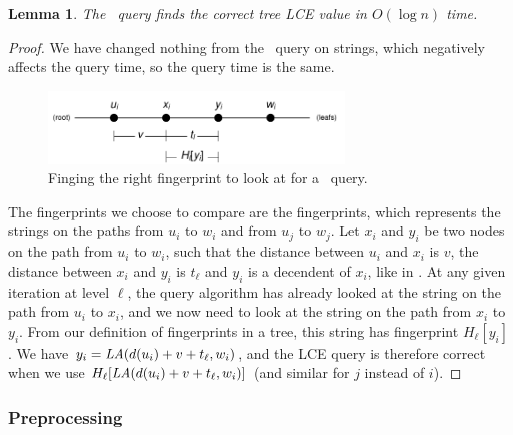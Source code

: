 \documentclass[a4]{article}
\newcommand*{\pref}{\prettyref}
\newtheorem{lemma}{Lemma}
\begin{document}
\begin{lemma}
The \tfprintk\ query finds the correct tree LCE value in $O(\log n)$ time.
\end{lemma}
\begin{proof}
We have changed nothing from the \fprintk\ query on strings, which negatively affects the query time, so the query time is the same.


\begin{figure}[tp]
    \begin{center}
        \includegraphics[width=0.7\textwidth]{tree-fingerprint.pdf}
    \end{center}
    \caption{\label{fig:tree-query}Finging the right fingerprint to look at for a \tfprintk\ query.}
\end{figure}

The fingerprints we choose to compare are the fingerprints, which represents the strings on the paths from $u_i$ to $w_i$ and from $u_j$ to $w_j$. Let $x_i$ and $y_i$ be two nodes on the path from $u_i$ to $w_i$, such that the distance between $u_i$ and $x_i$ is $v$, the distance between $x_i$ and $y_i$ is $t_\ell$ and $y_i$ is a decendent of $x_i$, like in \pref{fig:tree-query}. At any given iteration at level $\ell$, the query algorithm has already looked at the string on the path from $u_i$ to $x_i$, and we now need to look at the string on the path from $x_i$ to $y_i$. From our definition of fingerprints in a tree, this string has fingerprint $H_\ell[y_i]$. We have $y_i = \textit{LA}(d(u_i)+v+t_\ell,w_i)$, and the LCE query is therefore correct when we use $H_\ell[\textit{LA}(d(u_i)+v+t_\ell,w_i)]$ (and similar for $j$ instead of $i$).
\end{proof}

\subsubsection{Preprocessing}
\end{document}
